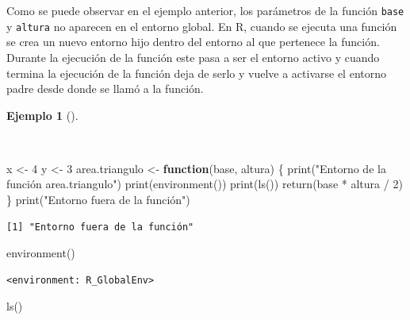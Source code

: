 \documentclass[
  a4paper,
]{scrreport}
\newenvironment{Shaded}{\begin{snugshade}}{\end{snugshade}}
\newcommand{\ControlFlowTok}[1]{\textcolor[rgb]{0.00,0.23,0.31}{\textbf{#1}}}
\newcommand{\DecValTok}[1]{\textcolor[rgb]{0.68,0.00,0.00}{#1}}
\newcommand{\FunctionTok}[1]{\textcolor[rgb]{0.28,0.35,0.67}{#1}}
\newcommand{\NormalTok}[1]{\textcolor[rgb]{0.00,0.23,0.31}{#1}}
\newcommand{\OtherTok}[1]{\textcolor[rgb]{0.00,0.23,0.31}{#1}}
\newcommand{\SpecialCharTok}[1]{\textcolor[rgb]{0.37,0.37,0.37}{#1}}
\newcommand{\StringTok}[1]{\textcolor[rgb]{0.13,0.47,0.30}{#1}}
\theoremstyle{definition}
\theoremstyle{definition}
\newtheorem{example}{Ejemplo}[chapter]
\theoremstyle{remark}
\begin{document}
Como se puede observar en el ejemplo anterior, los parámetros de la
función \texttt{base} y \texttt{altura} no aparecen en el entorno
global. En R, cuando se ejecuta una función se crea un nuevo entorno
hijo dentro del entorno al que pertenece la función. Durante la
ejecución de la función este pasa a ser el entorno activo y cuando
termina la ejecución de la función deja de serlo y vuelve a activarse el
entorno padre desde donde se llamó a la función.

\begin{example}[]\protect\hypertarget{exm-activacion-entorno-funcion}{}\label{exm-activacion-entorno-funcion}

~

\begin{Shaded}
\begin{Highlighting}[]
\NormalTok{x }\OtherTok{\textless{}{-}} \DecValTok{4}
\NormalTok{y }\OtherTok{\textless{}{-}} \DecValTok{3}
\NormalTok{area.triangulo }\OtherTok{\textless{}{-}} \ControlFlowTok{function}\NormalTok{(base, altura) \{}
  \FunctionTok{print}\NormalTok{(}\StringTok{"Entorno de la función area.triangulo"}\NormalTok{) }
  \FunctionTok{print}\NormalTok{(}\FunctionTok{environment}\NormalTok{())}
  \FunctionTok{print}\NormalTok{(}\FunctionTok{ls}\NormalTok{())}
  \FunctionTok{return}\NormalTok{(base }\SpecialCharTok{*}\NormalTok{ altura }\SpecialCharTok{/} \DecValTok{2}\NormalTok{)}
\NormalTok{\}}
\FunctionTok{print}\NormalTok{(}\StringTok{"Entorno fuera de la función"}\NormalTok{)}
\end{Highlighting}
\end{Shaded}

\begin{verbatim}
[1] "Entorno fuera de la función"
\end{verbatim}

\begin{Shaded}
\begin{Highlighting}[]
\FunctionTok{environment}\NormalTok{()}
\end{Highlighting}
\end{Shaded}

\begin{verbatim}
<environment: R_GlobalEnv>
\end{verbatim}

\begin{Shaded}
\begin{Highlighting}[]
\FunctionTok{ls}\NormalTok{()}
\end{Highlighting}
\end{Shaded}


\end{example}
\end{document}

